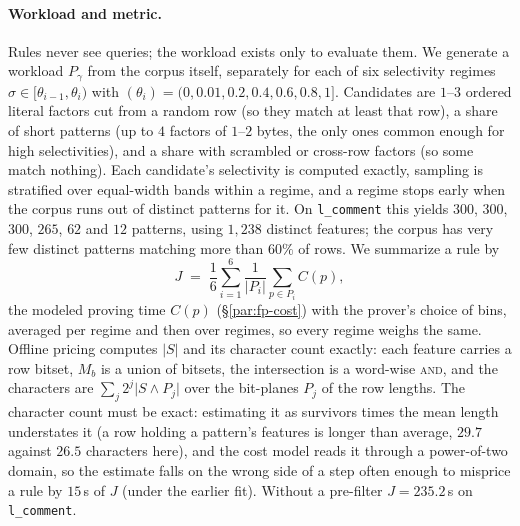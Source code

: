 \paragraph{Workload and metric.}
Rules never see queries; the workload exists only to evaluate them. We
generate a workload $P_\gamma$ from the corpus itself, separately for
each of six selectivity regimes $\sigma \in [\theta_{i-1}, \theta_i)$
with $(\theta_i) = (0, 0.01, 0.2, 0.4, 0.6, 0.8, 1]$. Candidates are
$1$--$3$ ordered literal factors cut from a random row (so they match at
least that row), a share of short patterns (up to $4$ factors of
$1$--$2$ bytes, the only ones common enough for high selectivities), and
a share with scrambled or cross-row factors (so some match nothing).
Each candidate's selectivity is computed exactly, sampling is stratified
over equal-width bands within a regime, and a regime stops early when
the corpus runs out of distinct patterns for it. On
\texttt{l\_comment} this yields $300$, $300$, $300$, $265$, $62$ and $12$
patterns, using $1{,}238$ distinct features; the corpus has very few
distinct patterns matching more than $60\%$ of rows. We summarize a rule
by
\[
  J \;=\; \frac{1}{6} \sum_{i=1}^{6} \frac{1}{|P_i|} \sum_{p \in P_i} C(p),
\]
the modeled proving time $C(p)$ (\S\ref{par:fp-cost}) with the prover's
choice of bins, averaged per regime and then over regimes, so every
regime weighs the same. Offline pricing computes $|S|$ and its character
count exactly: each feature carries a row bitset, $M_b$ is a union of
bitsets, the intersection is a word-wise \textsc{and}, and the
characters are $\sum_j 2^j \lvert S \wedge P_j \rvert$ over the
bit-planes $P_j$ of the row lengths. The character count must be exact:
estimating it as survivors times the mean length understates it (a row
holding a pattern's features is longer than average, $29.7$ against
$26.5$ characters here), and the cost model reads it through a
power-of-two domain, so the estimate falls on the wrong side of a step
often enough to misprice a rule by $15$\,s of $J$ (under the earlier
fit). Without a pre-filter $J = 235.2$\,s on \texttt{l\_comment}.

